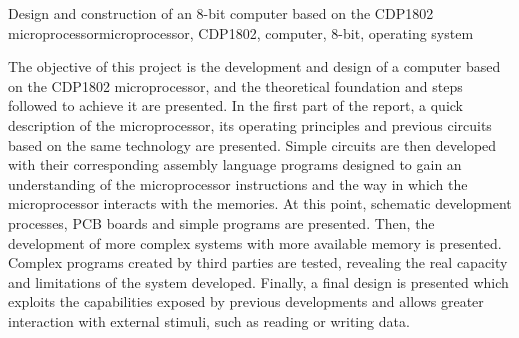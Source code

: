 
\begin{theabstract}{Design and construction of an 8-bit computer based on the CDP1802 microprocessor}{microprocessor, CDP1802, computer, 8-bit, operating system}

The objective of this project is the development and design of a computer based on the CDP1802 microprocessor, and the theoretical foundation and steps followed to achieve it are presented. In the first part of the report, a quick description of the microprocessor, its operating principles and previous circuits based on the same technology are presented. Simple circuits are then developed with their corresponding assembly language programs designed to gain an understanding of the microprocessor instructions and the way in which the microprocessor interacts with the memories. At this point, schematic development processes, PCB boards and simple programs are presented. Then, the development of more complex systems with more available memory is presented. Complex programs created by third parties are tested, revealing the real capacity and limitations of the system developed. Finally, a final design is presented which exploits the capabilities exposed by previous developments and allows greater interaction with external stimuli, such as reading or writing data.

\end{theabstract}

